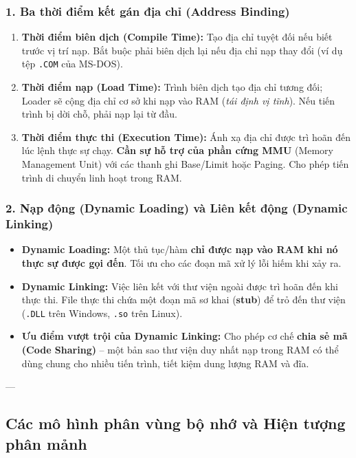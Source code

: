 \documentclass[11pt,a4paper]{article}
\begin{document}
\subsubsection{1. Ba thời điểm kết gán địa chỉ (Address Binding)}
\begin{enumerate}
    \item \textbf{Thời điểm biên dịch (Compile Time):} Tạo địa chỉ tuyệt đối nếu biết trước vị trí nạp. Bắt buộc phải biên dịch lại nếu địa chỉ nạp thay đổi (ví dụ tệp \texttt{.COM} của MS-DOS).
    \item \textbf{Thời điểm nạp (Load Time):} Trình biên dịch tạo địa chỉ tương đối; Loader sẽ cộng địa chỉ cơ sở khi nạp vào RAM (\textit{tái định vị tĩnh}). Nếu tiến trình bị dời chỗ, phải nạp lại từ đầu.
    \item \textbf{Thời điểm thực thi (Execution Time):} Ánh xạ địa chỉ được trì hoãn đến lúc lệnh thực sự chạy. \textbf{Cần sự hỗ trợ của phần cứng MMU} (Memory Management Unit) với các thanh ghi Base/Limit hoặc Paging. Cho phép tiến trình di chuyển linh hoạt trong RAM.
\end{enumerate}

\subsubsection{2. Nạp động (Dynamic Loading) và Liên kết động (Dynamic Linking)}
\begin{itemize}
    \item \textbf{Dynamic Loading:} Một thủ tục/hàm \textbf{chỉ được nạp vào RAM khi nó thực sự được gọi đến}. Tối ưu cho các đoạn mã xử lý lỗi hiếm khi xảy ra.
    \item \textbf{Dynamic Linking:} Việc liên kết với thư viện ngoài được trì hoãn đến khi thực thi. File thực thi chứa một đoạn mã sơ khai (\textbf{stub}) để trỏ đến thư viện (\texttt{.DLL} trên Windows, \texttt{.so} trên Linux).
    \item \textbf{Ưu điểm vượt trội của Dynamic Linking:} Cho phép cơ chế \textbf{chia sẻ mã (Code Sharing)} -- một bản sao thư viện duy nhất nạp trong RAM có thể dùng chung cho nhiều tiến trình, tiết kiệm dung lượng RAM và đĩa.
\end{itemize}

---

\subsection{Các mô hình phân vùng bộ nhớ và Hiện tượng phân mảnh}
\end{document}
